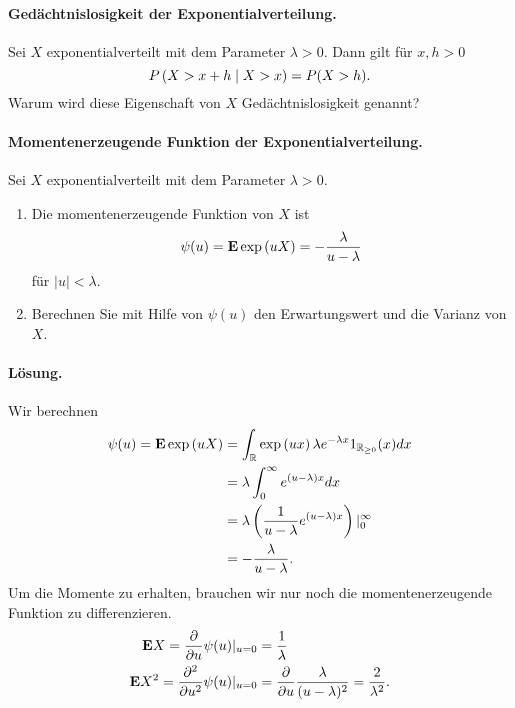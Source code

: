 \paragraph{Gedächtnislosigkeit der Exponentialverteilung.}
Sei $X$ exponentialverteilt mit dem Parameter $\lambda>0$. Dann gilt für
$x,h>0$ 
\begin{equation*}
    P\left( X > x+h \;\middle\vert\; X > x \right) = P( X > h).
\end{equation*}
Warum wird diese Eigenschaft von $X$ Gedächtnislosigkeit genannt?

\paragraph{Momentenerzeugende Funktion der Exponentialverteilung. }
Sei $X$ exponentialverteilt mit dem Parameter $\lambda>0$. 
\begin{enumerate}
    \item Die momentenerzeugende Funktion von $X$ ist 
        \begin{equation*}
            \psi (u) = \mathbf{E} \exp \left( u X \right) = - \frac{\lambda}{u - \lambda}
        \end{equation*}
        für $|u| < \lambda$. 
    \item Berechnen Sie mit Hilfe von $\psi(u)$ den Erwartungswert und die Varianz von $X$. 
\end{enumerate}
\paragraph*{Lösung.} 
Wir berechnen
\begin{align*}
    \psi(u) = \mathbf{E} \exp \left( u X \right) &= 
    \int_{\mathbb R}^{} \exp \left( ux \right) \lambda e^{-\lambda x} 1_{\mathbb R_{\geq 0}}(x) dx \\
    &= \lambda \int_{0}^{\infty} e^{(u-\lambda)x} dx \\
    &= \lambda \left( \frac{1}{u-\lambda} e^{(u-\lambda)x} \right) |_{0}^{\infty}\\
    &= -\frac{\lambda}{u- \lambda}. 
\end{align*}
Um die Momente zu erhalten, brauchen wir nur noch die momentenerzeugende Funktion 
zu differenzieren. 
\begin{align*}
    \mathbf{E} X = \frac{\partial}{ \partial u} \psi (u) |_{u=0} &= \frac{1}{\lambda} \\
    \mathbf{E} X^2 = \frac{\partial^2}{\partial u^2} \psi (u) |_{u=0} &=
    \frac{\partial}{\partial u} \frac{\lambda}{(u-\lambda)^2} = \frac{2}{\lambda^2}. 
\end{align*}

